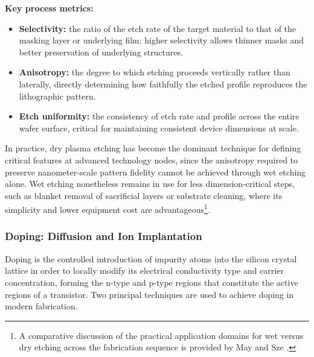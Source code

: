 \documentclass[10pt,a4paper]{article}
\begin{document}
\textbf{Key process metrics:}
\begin{itemize}
    \item \textbf{Selectivity:} the ratio of the etch rate of the target 
    material to that of the masking layer or underlying film; higher selectivity 
    allows thinner masks and better preservation of underlying structures.
    \item \textbf{Anisotropy:} the degree to which etching proceeds vertically 
    rather than laterally, directly determining how faithfully the etched 
    profile reproduces the lithographic pattern.
    \item \textbf{Etch uniformity:} the consistency of etch rate and profile 
    across the entire wafer surface, critical for maintaining consistent device 
    dimensions at scale.
\end{itemize}

In practice, dry plasma etching has become the dominant technique for defining 
critical features at advanced technology nodes, since the anisotropy required 
to preserve nanometer-scale pattern fidelity cannot be achieved through wet 
etching alone. Wet etching nonetheless remains in use for less 
dimension-critical steps, such as blanket removal of sacrificial layers or 
substrate cleaning, where its simplicity and lower equipment cost are 
advantageous\footnote{A comparative discussion of the practical application 
domains for wet versus dry etching across the fabrication sequence is provided 
by May and Sze \cite{maysze2004}.}.

\subsubsection{Doping: Diffusion and Ion Implantation}

Doping is the controlled introduction of impurity atoms into the silicon 
crystal lattice in order to locally modify its electrical conductivity type 
and carrier concentration, forming the n-type and p-type regions that 
constitute the active regions of a transistor. Two principal techniques are 
used to achieve doping in modern fabrication.
\end{document}
